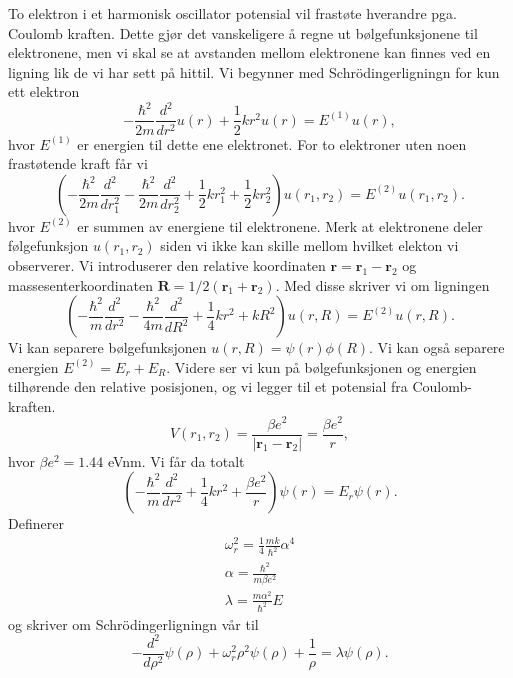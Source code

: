 \documentclass[reprint,english,notitlepage]{revtex4-1}
\begin{document}
	To elektron i et harmonisk oscillator potensial vil frastøte hverandre pga. Coulomb kraften. Dette gjør det vanskeligere å regne ut bølgefunksjonene til elektronene, men vi skal se at avstanden mellom elektronene kan finnes ved en ligning lik de vi har sett på hittil.
	Vi begynner med Schrödingerligningn for kun ett elektron
	\begin{equation*}
	-\frac{\hbar^2}{2 m} \frac{d^2}{dr^2} u(r) 
	+ \frac{1}{2}k r^2u(r)  = E^{(1)} u(r),
	\end{equation*}
	hvor $E^{(1)}$ er energien til dette ene elektronet. For to elektroner uten noen frastøtende kraft får vi
	\begin{equation*}
	\left(  -\frac{\hbar^2}{2 m} \frac{d^2}{dr_1^2} -\frac{\hbar^2}{2 m} \frac{d^2}{dr_2^2}+ \frac{1}{2}k r_1^2+ \frac{1}{2}k r_2^2\right)u(r_1,r_2)  = E^{(2)} u(r_1,r_2) .
	\end{equation*}
	hvor $E^{(2)}$ er summen av energiene til elektronene. Merk at elektronene deler følgefunksjon $u(r_1, r_2)$ siden vi ikke kan skille mellom hvilket elekton vi observerer. Vi introduserer den relative koordinaten $\mathbf{r} = \mathbf{r}_1-\mathbf{r}_2$ og massesenterkoordinaten $\mathbf{R} = 1/2(\mathbf{r}_1+\mathbf{r}_2)$. Med disse skriver vi om ligningen
	\begin{equation*}
	\left(  -\frac{\hbar^2}{m} \frac{d^2}{dr^2} -\frac{\hbar^2}{4 m} \frac{d^2}{dR^2}+ \frac{1}{4} k r^2+  kR^2\right)u(r,R)  = E^{(2)} u(r,R).
	\end{equation*}
	Vi kan separere bølgefunksjonen $u(r,R) = \psi(r)\phi(R)$. Vi kan også separere energien $E^{(2)}=E_r+E_R$. Videre ser vi kun på bølgefunksjonen og energien tilhørende den relative posisjonen, og vi legger til et potensial fra Coulomb-kraften.
	\begin{equation*}
	V(r_1,r_2) = \frac{\beta e^2}{|\mathbf{r}_1-\mathbf{r}_2|}=\frac{\beta e^2}{r},
	\end{equation*}
	hvor $\beta e^2=1.44$ eVnm. Vi får da totalt
	\begin{equation*}
	\left(  -\frac{\hbar^2}{m} \frac{d^2}{dr^2}+ \frac{1}{4}k r^2+\frac{\beta e^2}{r}\right)\psi(r)  = E_r \psi(r).
	\end{equation*}
	Definerer 
	\begin{equation*}
	\begin{aligned}
	\omega_r^2=\frac{1}{4}\frac{mk}{\hbar^2} \alpha^4 \\
	\alpha = \frac{\hbar^2}{m\beta e^2} \\
	\lambda = \frac{m\alpha^2}{\hbar^2}E
	\end{aligned}
	\end{equation*}
	og skriver om Schrödingerligningn vår til
	\begin{equation*}
	-\frac{d^2}{d\rho^2} \psi(\rho) + \omega_r^2\rho^2\psi(\rho) +\frac{1}{\rho} = \lambda \psi(\rho).
	\end{equation*}
	
\end{document}
